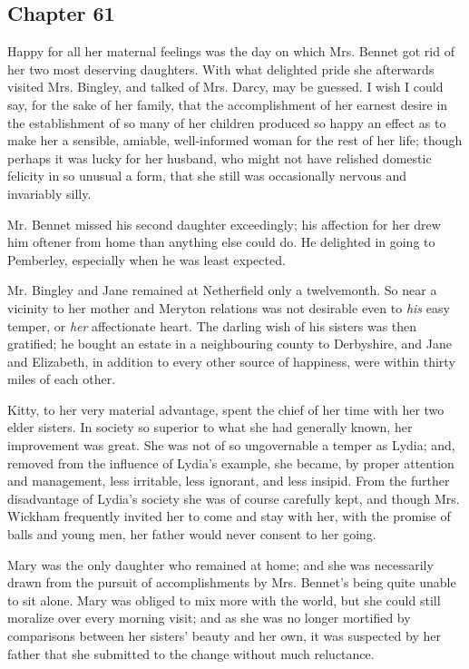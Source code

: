 \subsection[chapter-61]{\useURL[url61][][][]\from[url61] Chapter 61}

Happy for all her maternal feelings was the day on which Mrs. Bennet got rid of her two most deserving daughters. With what delighted pride she afterwards visited Mrs. Bingley, and talked of Mrs. Darcy, may be guessed. I wish I could say, for the sake of her family, that the accomplishment of her earnest desire in the establishment of so many of her children produced so happy an effect as to make her a sensible, amiable, well-informed woman for the rest of her life; though perhaps it was lucky for her husband, who might not have relished domestic felicity in so unusual a form, that she still was occasionally nervous and invariably silly.

Mr. Bennet missed his second daughter exceedingly; his affection for her drew him oftener from home than anything else could do. He delighted in going to Pemberley, especially when he was least expected.

Mr. Bingley and Jane remained at Netherfield only a twelvemonth. So near a vicinity to her mother and Meryton relations was not desirable even to {\em his} easy temper, or {\em her} affectionate heart. The darling wish of his sisters was then gratified; he bought an estate in a neighbouring county to Derbyshire, and Jane and Elizabeth, in addition to every other source of happiness, were within thirty miles of each other.

Kitty, to her very material advantage, spent the chief of her time with her two elder sisters. In society so superior to what she had generally known, her improvement was great. She was not of so ungovernable a temper as Lydia; and, removed from the influence of Lydia's example, she became, by proper attention and management, less irritable, less ignorant, and less insipid. From the further disadvantage of Lydia's society she was of course carefully kept, and though Mrs. Wickham frequently invited her to come and stay with her, with the promise of balls and young men, her father would never consent to her going.

Mary was the only daughter who remained at home; and she was necessarily drawn from the pursuit of accomplishments by Mrs. Bennet's being quite unable to sit alone. Mary was obliged to mix more with the world, but she could still moralize over every morning visit; and as she was no longer mortified by comparisons between her sisters' beauty and her own, it was suspected by her father that she submitted to the change without much reluctance.

